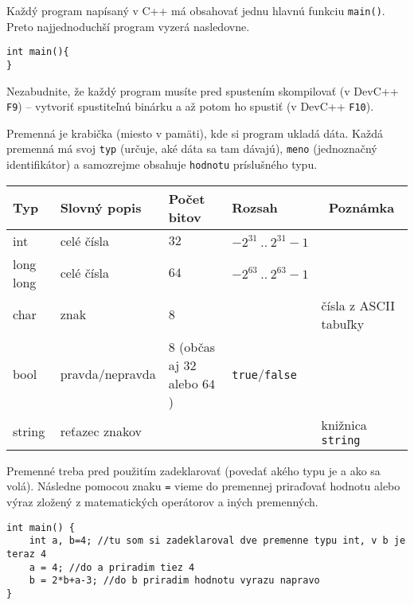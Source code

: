 




Každý program napísaný v C++ má obsahovať jednu hlavnú funkciu \texttt{main()}. Preto najjednoduchší
program vyzerá nasledovne.

\begin{lstlisting}
int main(){
}
\end{lstlisting}

Nezabudnite, že každý program musíte pred spustením skompilovať (v DevC++ \texttt{F9}) -- vytvoriť
spustiteľnú binárku a až potom ho spustiť (v DevC++ \texttt{F10}).


Premenná je krabička (miesto v pamäti), kde si program ukladá dáta. Každá premenná má svoj
\texttt{typ} (určuje, aké dáta sa tam dávajú), \texttt{meno} (jednoznačný identifikátor) a
samozrejme obsahuje \texttt{hodnotu} príslušného typu.

\begin{tabular}{| l | l | l | l | l |}
\hline
Typ & Slovný popis & Počet bitov & Rozsah & Poznámka \\ \hline
int & celé čísla & $32$ & $-2^{31}\ ..\ 2^{31}-1$ &  \\ \hline
long long & celé čísla & $64$ & $-2^{63}\ ..\ 2^{63}-1$ &  \\ \hline
char & znak & 8 & & čísla z ASCII tabuľky \\ \hline
bool & pravda/nepravda & $8$ (občas aj $32$ alebo $64$) & \texttt{true}/\texttt{false} & \\ \hline
string & reťazec znakov & & & knižnica \texttt{string} \\ \hline
\end{tabular}

Premenné treba pred použitím zadeklarovať (povedať akého typu je a ako sa volá). Následne pomocou
znaku \texttt{=} vieme do premennej priraďovať hodnotu alebo výraz zložený z matematických
operátorov a iných premenných.

\begin{lstlisting}
int main() {
    int a, b=4; //tu som si zadeklaroval dve premenne typu int, v b je teraz 4
    a = 4; //do a priradim tiez 4
    b = 2*b+a-3; //do b priradim hodnotu vyrazu napravo
}
\end{lstlisting}

